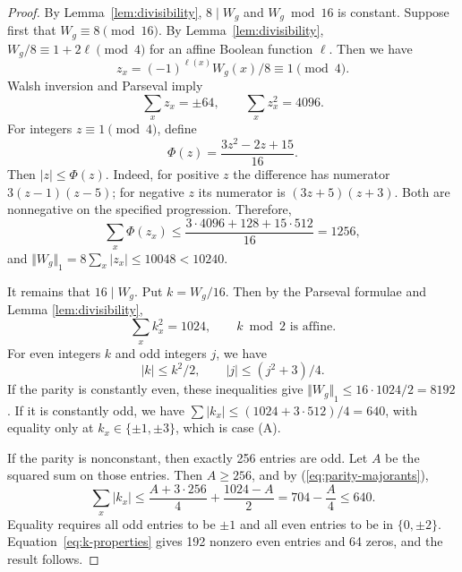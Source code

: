 \documentclass[11pt]{article}
\newtheorem{open problem}{Open problem}
\begin{document}
\begin{proof}
By Lemma~\ref{lem:divisibility}, $8\mid W_g$ and $W_g\bmod16$ is constant. Suppose first that $W_g\equiv8\pmod{16}$. By Lemma~\ref{lem:divisibility}, $W_g/8\equiv1+2\ell\pmod4$ for an affine Boolean function $\ell$. Then we have
\begin{equation}\label{eq:z}
z_x=(-1)^{\ell(x)}W_g(x)/8\equiv1\pmod4.
\end{equation}
Walsh inversion and Parseval imply
\begin{equation}\label{eq:z-moments}
\sum_xz_x=\pm64,\qquad \sum_xz_x^2=4096.
\end{equation}
For integers $z\equiv1\pmod4$, define
\begin{equation}\label{eq:majorant}
\Phi(z)=\frac{3z^2-2z+15}{16}.
\end{equation}
Then $|z|\le\Phi(z)$. Indeed, for positive $z$ the difference has numerator $3(z-1)(z-5)$; for negative $z$ its numerator is $(3z+5)(z+3)$. Both are nonnegative on the specified progression. Therefore,
\begin{equation}\label{eq:sum-majorant}
\sum_x\Phi(z_x)\le
\frac{3\cdot4096+128+15\cdot512}{16}=1256,
\end{equation}
and ${\Vert W_g\Vert }_{1}=8\sum_x |z_x|\le10048<10240$.

It remains that $16\mid W_g$. Put $k=W_g/16$. Then by the Parseval formulae and Lemma \ref{lem:divisibility},
\begin{equation}\label{eq:k-properties}
\sum_xk_x^2=1024,\qquad k\bmod2\text{ is affine}.
\end{equation}
For even integers $k$ and odd integers $j$, we have
\begin{equation}\label{eq:parity-majorants}
|k|\le k^2/2,\qquad |j|\le(j^2+3)/4.
\end{equation}
If the parity is constantly even, these inequalities give ${\Vert W_g\Vert }_{1}\le16\cdot1024/2=8192$. If it is constantly odd, we have $\sum|k_x|\le(1024+3\cdot512)/4=640$, with equality only at $k_x\in\{\pm1,\pm3\}$, which is case (A).

If the parity is nonconstant, then exactly 256 entries are odd. Let $A$ be the squared sum on those entries. Then $A\ge256$, and by (\ref{eq:parity-majorants}),
\begin{equation}\label{eq:balanced-l1}
\sum_x|k_x|\le\frac{A+3\cdot256}{4}+\frac{1024-A}{2}
=704-\frac A4\le640.
\end{equation}
Equality requires all odd entries to be $\pm1$ and all even entries to be in $\{0,\pm2\}$. Equation~\eqref{eq:k-properties} gives 192 nonzero even entries and 64 zeros, and the result follows. 
\end{proof}
\end{document}
